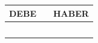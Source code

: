 \documentclass{article}
\begin{document}
\begin{table}[H]
    \centering
    \begin{tabular}{|p{3cm}|p{6cm}|p{3cm}|}
    \hline
    \textbf{DEBE} & \textbf{} & \textbf{HABER} \\
    \hline
    & & \\
    \hline
    & & \\
    \hline
    & & \\
    \hline
    & & \\
    \hline
    & & \\
    \hline
    \end{tabular}
\end{table}
\end{document}
